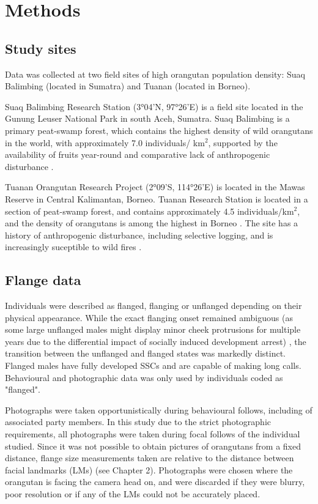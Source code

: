 \section{Methods}
\subsection{Study sites}
Data was collected at two field sites of high orangutan population density: Suaq Balimbing (located in Sumatra) and Tuanan (located in Borneo).

Suaq Balimbing Research Station (3°04'N, 97°26'E) is a field site located in the Gunung Leuser National Park  in south Aceh, Sumatra. Suaq Balimbing is a primary peat-swamp forest, which contains the highest density of wild orangutans in the world, with approximately 7.0 individuals/ km$^{2}$, supported by the availability of fruits year-round and comparative lack of anthropogenic disturbance \citep{Fox.2004, Schaik.1995}.

Tuanan Orangutan Research Project (2°09'S, 114°26'E) is located in the Mawas Reserve in Central Kalimantan, Borneo. Tuanan Research Station is located in a section of peat-swamp forest, and contains approximately 4.5 individuals/km$^{2}$, and the density of orangutans is among the highest in Borneo \citep{Husson.2008} . The site has a history of anthropogenic disturbance, including selective logging, and is increasingly suceptible to wild fires \citep{Cochrane.1999, Erb.2018}.

\subsection{Flange data}
Individuals were described as flanged, flanging or unflanged depending on their physical appearance. While the exact flanging onset remained ambiguous (as some large unflanged males might display minor cheek protrusions for multiple years due to the differential impact of socially induced development arrest) \citep{Kunz.2023}, the transition between the unflanged and flanged states was markedly distinct. Flanged males have fully developed SSCs and are capable of making long calls. Behavioural and photographic data was only used by individuals coded as "flanged".

Photographs were taken opportunistically during behavioural follows, including of associated party members. In this study due to the strict photographic requirements, all photographs were taken during focal follows of the individual studied. Since it was not possible to obtain pictures of orangutans from a fixed distance, flange size measurements taken are relative to the distance between facial landmarks (LMs) (see Chapter 2). Photographs were chosen where the orangutan is facing the camera head on, and were discarded if they were blurry, poor resolution or if any of the LMs could not be accurately placed. 


